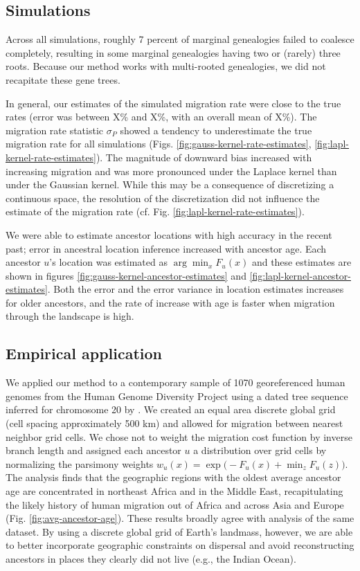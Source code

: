 \subsection{Simulations}

Across all simulations, roughly 7 percent of marginal genealogies failed to
coalesce completely, resulting in some marginal genealogies having two or (rarely)
three roots. Because our method works with multi-rooted genealogies, we did
not recapitate these gene trees.

In general, our estimates of the simulated migration rate were close to the 
true rates (error was between X\% and X\%, with an overall mean of X\%).
The migration rate statistic $\sigma_P$ showed a tendency to underestimate the
true migration rate for all simulations (Figs. \ref{fig:gauss-kernel-rate-estimates}, 
\ref{fig:lapl-kernel-rate-estimates}). The magnitude of downward bias 
increased with increasing migration and was more pronounced under the Laplace 
kernel than under the Gaussian kernel. While this may be a consequence of
discretizing a continuous space, the resolution of the discretization did not
influence the estimate of the migration rate (cf. Fig. \ref{fig:lapl-kernel-rate-estimates}).

We were able to estimate ancestor locations with high accuracy in the recent past; 
error in ancestral location inference increased with ancestor age.
Each ancestor $u$'s location was estimated as $\arg\min_x F_u(x)$ and these
estimates are shown in figures \ref{fig:gauss-kernel-ancestor-estimates} and 
\ref{fig:lapl-kernel-ancestor-estimates}. Both the error and the error variance
in location estimates increases for older ancestors, and the rate of increase
with age is faster when migration through the landscape is high. 

\subsection{Empirical application}

We applied our method to a contemporary sample of 1070 georeferenced human
genomes from the Human Genome Diversity Project using a dated tree sequence
inferred for chromosome 20 by \citet{Wohns_etal_2022}. We created an equal 
area discrete global grid \citep{Barnes_Sahr_2023} (cell spacing approximately 
500 km) and allowed for migration between nearest neighbor grid cells. We
chose not to weight the migration cost function by inverse branch length and
assigned each ancestor $u$ a distribution over grid cells by normalizing the 
parsimony weights $w_u(x) = \exp\bigl(-F_u(x) + \min_z F_u(z)\bigr)$.
The analysis finds that the geographic regions with the oldest average ancestor
age are concentrated in northeast Africa and in the Middle East, recapitulating
the likely history of human migration out of Africa and across Asia and Europe 
(Fig. \ref{fig:avg-ancestor-age}). These results broadly agree with 
\citet{Wohns_etal_2022} analysis of the same dataset. By using a discrete global 
grid of Earth's landmass, however, we are able to better incorporate geographic
constraints on dispersal and avoid reconstructing ancestors in places they
clearly did not live (e.g., the Indian Ocean).

